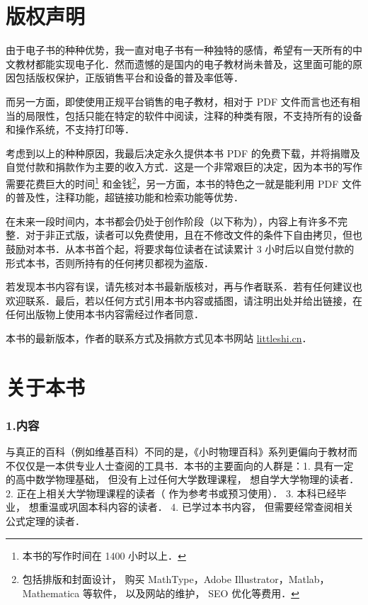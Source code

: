 
\chapter*{版权声明}
由于电子书的种种优势，我一直对电子书有一种独特的感情，希望有一天所有的中文教材都能实现电子化．然而遗憾的是国内的电子教材尚未普及，这里面可能的原因包括版权保护，正版销售平台和设备的普及率低等．

而另一方面，即使使用正规平台销售的电子教材，相对于 PDF 文件而言也还有相当的局限性，包括只能在特定的软件中阅读，注释的种类有限，不支持所有的设备和操作系统，不支持打印等． 

考虑到以上的种种原因，我最后决定永久提供本书 PDF 的免费下载，并将捐赠及自觉付款和捐款作为主要的收入方式．这是一个非常艰巨的决定，因为本书的写作需要花费巨大的时间\footnote{本书的写作时间在 1400 小时以上．} 和金钱\footnote{包括排版和封面设计， 购买 MathType，Adobe Illustrator，Matlab，Mathematica 等软件， 以及网站的维护， SEO 优化等费用．}，另一方面，本书的特色之一就是能利用 PDF 文件的普及性，注释功能，超链接功能和检索功能等优势．

在未来一段时间内，本书都会仍处于创作阶段（以下称为），内容上有许多不完整．对于非正式版，读者可以免费使用，且在不修改文件的条件下自由拷贝，但也鼓励对本书．从本书首个起，将要求每位读者在试读累计 3 小时后以自觉付款的形式本书，否则所持有的任何拷贝都视为盗版．

若发现本书内容有误，请先核对本书最新版核对，再与作者联系．若有任何建议也欢迎联系．最后，若以任何方式引用本书内容或插图，请注明出处并给出链接，在任何出版物上使用本书内容需经过作者同意．

本书的最新版本，作者的联系方式及捐款方式见本书网站 \href{http://littleshi.cn}{\color{blue}littleshi.cn}．


\chapter*{关于本书}

\subsection{1.内容}

与真正的百科（例如维基百科）不同的是，《小时物理百科》系列更偏向于教材而不仅仅是一本供专业人士查阅的工具书．本书的主要面向的人群是：1. 具有一定的高中数学物理基础， 但没有上过任何大学数理课程， 想自学大学物理的读者． 2. 正在上相关大学物理课程的读者（ 作为参考书或预习使用）． 3. 本科已经毕业， 想重温或巩固本科内容的读者． 4. 已学过本书内容， 但需要经常查阅相关公式定理的读者．

